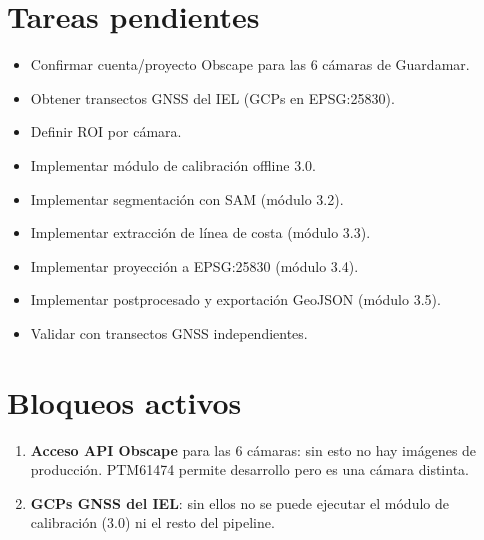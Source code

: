 \section{Tareas pendientes}

\begin{itemize}
  \item[$\square$] Confirmar cuenta/proyecto Obscape para las 6 cámaras
        de Guardamar.
  \item[$\square$] Obtener transectos GNSS del IEL (GCPs en EPSG:25830).
  \item[$\square$] Definir ROI por cámara.
  \item[$\square$] Implementar módulo de calibración offline 3.0.
  \item[$\square$] Implementar segmentación con SAM (módulo 3.2).
  \item[$\square$] Implementar extracción de línea de costa (módulo 3.3).
  \item[$\square$] Implementar proyección a EPSG:25830 (módulo 3.4).
  \item[$\square$] Implementar postprocesado y exportación GeoJSON (módulo 3.5).
  \item[$\square$] Validar con transectos GNSS independientes.
\end{itemize}

\section{Bloqueos activos}

\begin{enumerate}
  \item \textbf{Acceso API Obscape} para las 6 cámaras: sin esto no hay
        imágenes de producción. PTM61474 permite desarrollo pero es una
        cámara distinta.
  \item \textbf{GCPs GNSS del IEL}: sin ellos no se puede ejecutar el
        módulo de calibración (3.0) ni el resto del pipeline.
\end{enumerate}
